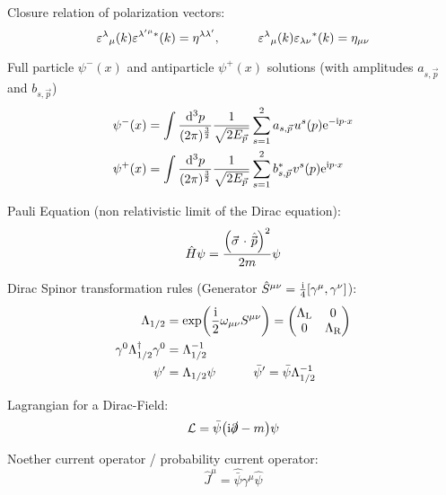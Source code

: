			Closure relation of polarization vectors:
			\begin{equation}
				\varepsilon^{\lambda}{}_{\mu}(k)\varepsilon^{\lambda^{\prime}{}^{\mu}\ast}(k)=\eta^{\lambda\lambda^{\prime}},
				\hspace{30pt}
				\varepsilon^{\lambda}{}_{\mu}(k)\varepsilon_{\lambda\nu}{}^{\ast}(k)=\eta_{\mu\nu}
			\end{equation}
			
			\noindent
			Full particle $\psi^{-}(x)$ and antiparticle $\psi^{+}(x)$ solutions (with amplitudes $a_{s,\vec{p}}$ and $b_{s,\vec{p}}$)
			\begin{equation}
				\begin{aligned}
					\psi^{-}(x) &= \int\frac{\dd^{3}p}{(2\pi)^{\frac{3}{2}}}\frac{1}{\sqrt{2E_{\vec{p}}}}\sum_{s=1}^{2}a_{s, \vec{p}}u^{s}(p)\ex^{-\i p\cdot x} \\
					\psi^{+}(x) &= \int\frac{\dd^{3}p}{(2\pi)^{\frac{3}{2}}}\frac{1}{\sqrt{2E_{\vec{p}}}}\sum_{s=1}^{2}{b_{s, \vec{p}}^{*}}v^{s}(p)\ex^{\i p\cdot x}
				\end{aligned}
			\end{equation}

			\noindent
			Pauli Equation (non relativistic limit of the Dirac equation):
			\begin{equation}
				\hat{H}\psi = \frac{\qty(\vec{\sigma}\cdot\hat{\vec{p}})^2}{2m} \psi
			\end{equation}
	
			\noindent
			Dirac Spinor transformation rules (Generator $\hat{S}^{\mu\nu} = \frac{\mathrm{i}}{4}[\gamma^\mu,\gamma^\nu]$):
			\begin{equation}
				\begin{aligned}
					\Lambda_{1/2} &= \exp(\frac{\i}{2}\omega_{\mu\nu}S^{\mu\nu}) = \mqty(\Lambda_\text{L} & 0 \\ 0 & \Lambda_\text{R}) \\
					\gamma^0 \Lambda_{1/2}^\dagger \gamma^0	&= \Lambda_{1/2}^{-1} \\
					\psi' &= \Lambda_{1/2} \psi 
					\hsp \bar{\psi}' = \bar{\psi} \Lambda_{1/2}^{-1} 
				\end{aligned}
			\end{equation}

			\noindent
			Lagrangian for a Dirac-Field:
			\begin{equation}
				\mathcal{L} = \bar{\psi} \qty(\mathrm{i} \slashed{\partial} - m) \psi
			\end{equation}
			
			Noether current operator / probability current operator:
			\begin{equation}
				\hat{J}^\mu = \hat{\bar{\psi}} \gamma^\mu \hat{\psi}
			\end{equation}

